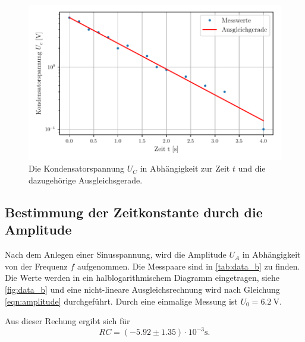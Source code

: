 \begin{figure}
  \centering
  \includegraphics{content/data_a_ausgleich.pdf}
  \caption{Die Kondensatorspannung $U_C$ in Abhängigkeit zur Zeit $t$ und die dazugehörige Ausgleichsgerade.}
  \label{fig:data_a}
\end{figure}

\subsection{Bestimmung der Zeitkonstante durch die Amplitude}
\label{subsec:Aufgabe_B}
Nach dem Anlegen einer Sinusspannung, wird die Amplitude $U_A$ in Abhängigkeit von der Frequenz $f$ aufgenommen.
Die Messpaare sind in \autoref{tab:data_b} zu finden.
Die Werte werden in ein halblogarithmischem Diagramm eingetragen, siehe \autoref{fig:data_b} und eine nicht-lineare Ausgleichsrechnung wird nach Gleichung \eqref{eqn:amplitude} durchgeführt.
Durch eine einmalige Messung ist $U_0 = \SI{6.2}{\volt}$.

\noindent
Aus dieser Rechung ergibt sich für 
\begin{equation*}
  RC = (-5.92 \pm 1.35) \cdot 10^{-3} \si{\second}.
\end{equation*}


